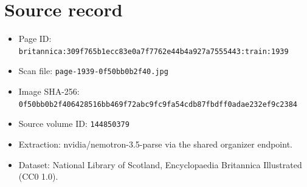\documentclass{article}
\begin{document}
\section*{Source record}
\begin{itemize}
\item Page ID: \texttt{britannica:309f765b1ecc83e0a7f7762e44b4a927a7555443:train:1939}
\item Scan file: \texttt{page-1939-0f50bb0b2f40.jpg}
\item Image SHA-256: \texttt{0f50bb0b2f406428516bb469f72abc9fc9fa54cdb87fbdff0adae232ef9c2384}
\item Source volume ID: \texttt{144850379}
\item Extraction: nvidia/nemotron-3.5-parse via the shared organizer endpoint.
\item Dataset: National Library of Scotland, Encyclopaedia Britannica Illustrated (CC0 1.0).
\end{itemize}
\end{document}
